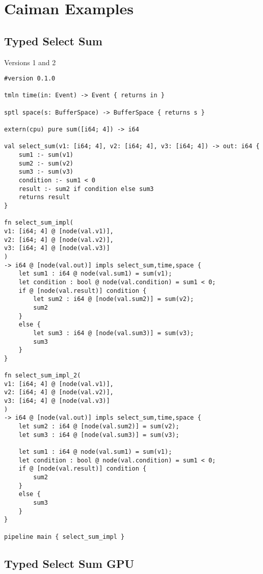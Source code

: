 \section{Caiman Examples}

\subsection{Typed Select Sum}
\label{subsec:typed-select-sum}

Versions 1 and 2

\begin{lstlisting}
#version 0.1.0

tmln time(in: Event) -> Event { returns in }

sptl space(s: BufferSpace) -> BufferSpace { returns s }

extern(cpu) pure sum([i64; 4]) -> i64

val select_sum(v1: [i64; 4], v2: [i64; 4], v3: [i64; 4]) -> out: i64 {
	sum1 :- sum(v1)
	sum2 :- sum(v2)
	sum3 :- sum(v3)
	condition :- sum1 < 0
	result :- sum2 if condition else sum3
	returns result
}

fn select_sum_impl(
v1: [i64; 4] @ [node(val.v1)], 
v2: [i64; 4] @ [node(val.v2)], 
v3: [i64; 4] @ [node(val.v3)]
) 
-> i64 @ [node(val.out)] impls select_sum,time,space {
	let sum1 : i64 @ node(val.sum1) = sum(v1);
	let condition : bool @ node(val.condition) = sum1 < 0;
	if @ [node(val.result)] condition {
		let sum2 : i64 @ [node(val.sum2)] = sum(v2);
		sum2
	}
	else {
		let sum3 : i64 @ [node(val.sum3)] = sum(v3);
		sum3
	}
}

fn select_sum_impl_2(
v1: [i64; 4] @ [node(val.v1)], 
v2: [i64; 4] @ [node(val.v2)], 
v3: [i64; 4] @ [node(val.v3)]
) 
-> i64 @ [node(val.out)] impls select_sum,time,space {
	let sum2 : i64 @ [node(val.sum2)] = sum(v2);
	let sum3 : i64 @ [node(val.sum3)] = sum(v3);
	
	let sum1 : i64 @ node(val.sum1) = sum(v1);
	let condition : bool @ node(val.condition) = sum1 < 0;
	if @ [node(val.result)] condition {
		sum2
	}
	else {
		sum3
	}
}

pipeline main { select_sum_impl }
\end{lstlisting}

\subsection{Typed Select Sum GPU}
\label{subsec:typed-select-sum-gpu}

